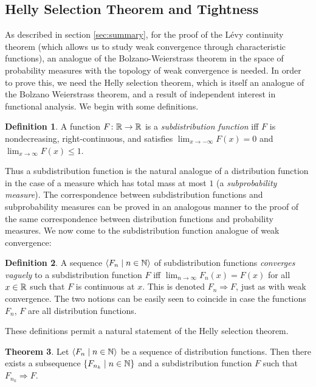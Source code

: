 \documentclass{article}
\theoremstyle{definition}
\newtheorem{theorem}{Theorem}[section]
\newtheorem{definition}[theorem]{Definition}
\newcommand{\bldset}[2]{\{{#1}\mid{#2}\}}
\newcommand{\bldseq}[2]{\langle{#1}\mid{#2}\rangle}
\begin{document}
\subsection{Helly Selection Theorem and Tightness} \label{sec:helly}

As described in section \ref{sec:summary}, for the proof of the L\'evy continuity theorem (which allows us to study weak convergence through characteristic functions), an analogue of the Bolzano-Weierstrass theorem in the space of probability measures with the topology of weak convergence is needed. In order to prove this, we need the Helly selection theorem, which is itself an analogue of the Bolzano Weierstrass theorem, and a result of independent interest in functional analysis. We begin with some definitions.

\begin{definition} \label{def:subdist}
A function $F\colon \mathbb{R} \rightarrow \mathbb{R}$ is a {\em subdistribution function} iff $F$ is nondecreasing, right-continuous, and satisfies $\lim_{x \rightarrow -\infty} F(x) = 0$ and $\lim_{x \rightarrow \infty} F(x) \le 1$.
\end{definition}

Thus a subdistribution function is the natural analogue of a distribution function in the case of a measure which has total mass at most $1$ (a {\em subprobability measure}). The correspondence between subdistribution functions and subprobability measures can be proved in an analogous manner to the proof of the same correspondence between distribution functions and probability measures. We now come to the subdistribution function analogue of weak convergence:

\begin{definition} \label{def:vague}
A sequence $\bldseq{F_n}{n \in \N}$ of subdistribution functions {\em converges vaguely} to a subdistribution function $F$ iff $\lim_{n \rightarrow \infty} F_n(x) = F(x)$ for all $x \in \mathbb{R}$ such that $F$ is continuous at $x$. This is denoted $F_n \Rightarrow F$, just as with weak convergence. The two notions can be easily seen to coincide in case the functions $F_n$, $F$ are all distribution functions.
\end{definition}

These definitions permit a natural statement of the Helly selection theorem.

\begin{theorem}
Let $\bldseq{F_n}{n \in \N}$ be a sequence of distribution functions. Then there exists a subsequence $\bldset{F_{n_k}}{n \in \N}$ and a subdistribution function $F$ such that $F_{n_k} \Rightarrow F$.
\end{theorem}
\end{document}

